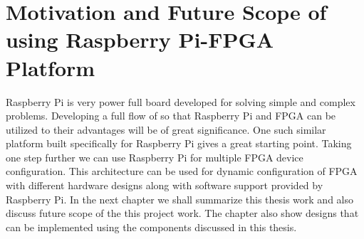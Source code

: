 \section{Motivation and Future Scope of using Raspberry Pi-FPGA Platform}
Raspberry Pi is very power full board developed for solving simple and complex problems. Developing a full flow of so that Raspberry Pi and FPGA can be utilized to their advantages will be of great significance. One such similar platform \cite{LOGIPi} built specifically for Raspberry Pi gives a great starting point. Taking one step further we can use Raspberry Pi for multiple FPGA device configuration. This architecture can be used for dynamic configuration of FPGA with different hardware designs along with software support provided by Raspberry Pi. In the next chapter we shall summarize this thesis work and also discuss future scope of the this project work. The chapter also show designs that can be implemented using the components discussed in this thesis.